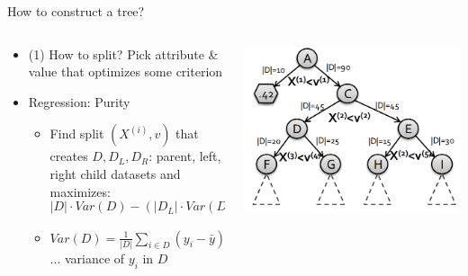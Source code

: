 \begin{frame}{How to construct a tree?}
    \begin{columns}
        \begin{column}{0.75\textwidth}
            \begin{itemize}
                \item (1) How to split? Pick attribute \& value that optimizes some criterion
                \item Regression: Purity
                \begin{itemize}
                    \item Find split $(X^{(i)}, v)$ that creates $D, D_L, D_R$: parent, left, right child datasets and maximizes:
                    \[
                    |D| \cdot Var(D) - (|D_L| \cdot Var(D_L) + |D_R| \cdot Var(D_R))
                    \]
                    \item $Var(D) = \frac{1}{|D|} \sum_{i \in D} (y_i - \bar{y})^2$ \quad ... variance of $y_i$ in $D$
                \end{itemize}
            \end{itemize}
        \end{column}
        \begin{column}{0.25\textwidth}
            \includegraphics[width=\linewidth]{images/decision-trees/decision-trees-10.png}
        \end{column}
    \end{columns}
\end{frame}


